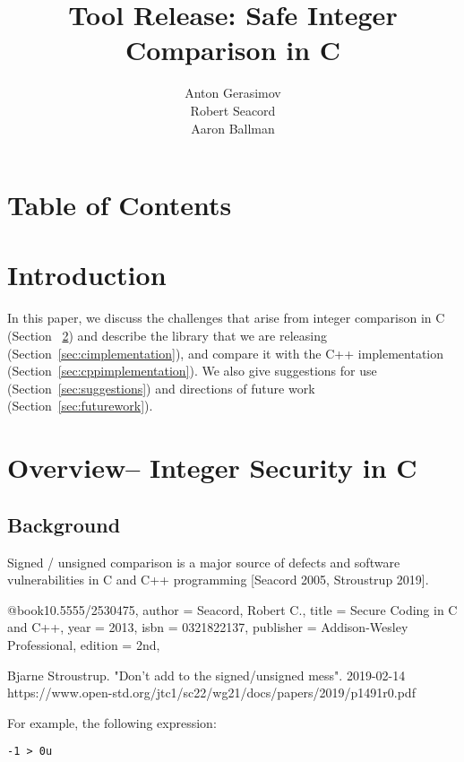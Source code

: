 \documentclass[11pt,letterpaper]{article}
\title{Tool Release: Safe Integer Comparison in C}
\author{Anton Gerasimov\\
Robert Seacord\\
Aaron Ballman}
\begin{document}
\maketitle
\newpage
\thispagestyle{fancy}
\clearpage
\section*{Table of Contents}
\makeatletter
\renewcommand\tableofcontents{\@starttoc{toc}} %
\makeatother
\bgroup%
\hypersetup%
\tableofcontents
\egroup%
\thispagestyle{nccsection}
\pagebreak


\section{Introduction}

In this paper, we discuss the challenges that arise from integer comparison in C (Section~
\ref{sec:overview}) and describe the library that we are releasing (Section~\ref{sec:cimplementation}), and compare it with the C++ implementation (Section~\ref{sec:cppimplementation}). 
We also give suggestions for use (Section~\ref{sec:suggestions}) and directions of future work (Section~\ref{sec:futurework}).

\section{Overview– Integer Security in C}
\label{sec:overview}

\subsection{Background }

Signed / unsigned comparison is a major source of defects and software vulnerabilities in C and C++ programming [Seacord 2005, Stroustrup 2019].

@book{10.5555/2530475,
author = {Seacord, Robert C.},
title = {Secure Coding in C and C++},
year = {2013},
isbn = {0321822137},
publisher = {Addison-Wesley Professional},
edition = {2nd},
}

Bjarne Stroustrup.  "Don’t add to the signed/unsigned mess". 2019-02-14 https://www.open-std.org/jtc1/sc22/wg21/docs/papers/2019/p1491r0.pdf

For example, the following expression:

\begin{lstlisting}[style=CStyle]
 -1 > 0u 
\end{lstlisting}
\end{document}
